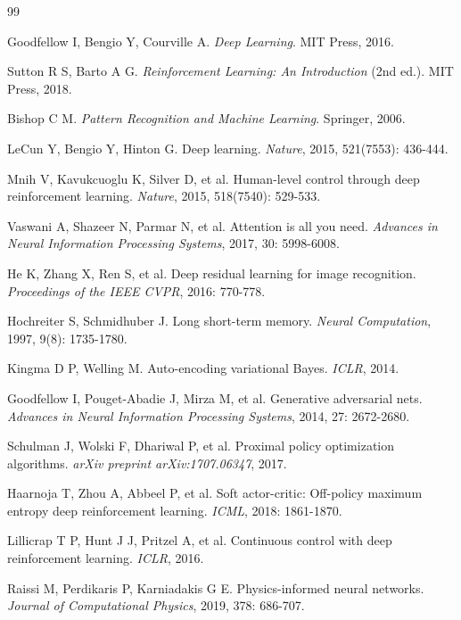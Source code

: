 \documentclass[12pt,a4paper]{article}
\numberwithin{figure}{section}
\numberwithin{table}{section}
\numberwithin{equation}{section}
\begin{document}
\begin{thebibliography}{99}

Goodfellow I, Bengio Y, Courville A. \textit{Deep Learning}. MIT Press, 2016.

Sutton R S, Barto A G. \textit{Reinforcement Learning: An Introduction} (2nd ed.). MIT Press, 2018.

Bishop C M. \textit{Pattern Recognition and Machine Learning}. Springer, 2006.

LeCun Y, Bengio Y, Hinton G. Deep learning. \textit{Nature}, 2015, 521(7553): 436-444.

Mnih V, Kavukcuoglu K, Silver D, et al. Human-level control through deep reinforcement learning. \textit{Nature}, 2015, 518(7540): 529-533.

Vaswani A, Shazeer N, Parmar N, et al. Attention is all you need. \textit{Advances in Neural Information Processing Systems}, 2017, 30: 5998-6008.

He K, Zhang X, Ren S, et al. Deep residual learning for image recognition. \textit{Proceedings of the IEEE CVPR}, 2016: 770-778.

Hochreiter S, Schmidhuber J. Long short-term memory. \textit{Neural Computation}, 1997, 9(8): 1735-1780.

Kingma D P, Welling M. Auto-encoding variational Bayes. \textit{ICLR}, 2014.

Goodfellow I, Pouget-Abadie J, Mirza M, et al. Generative adversarial nets. \textit{Advances in Neural Information Processing Systems}, 2014, 27: 2672-2680.

Schulman J, Wolski F, Dhariwal P, et al. Proximal policy optimization algorithms. \textit{arXiv preprint arXiv:1707.06347}, 2017.

Haarnoja T, Zhou A, Abbeel P, et al. Soft actor-critic: Off-policy maximum entropy deep reinforcement learning. \textit{ICML}, 2018: 1861-1870.

Lillicrap T P, Hunt J J, Pritzel A, et al. Continuous control with deep reinforcement learning. \textit{ICLR}, 2016.

Raissi M, Perdikaris P, Karniadakis G E. Physics-informed neural networks. \textit{Journal of Computational Physics}, 2019, 378: 686-707.


\end{thebibliography}
\end{document}
